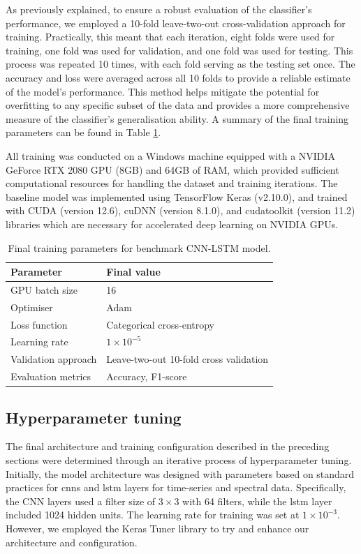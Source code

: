 As previously explained, to ensure a robust evaluation of the classifier's performance, we employed a 10-fold leave-two-out cross-validation approach for training. Practically, this meant that each iteration, eight folds were used for training, one fold was used for validation, and one fold was used for testing. This process was repeated 10 times, with each fold serving as the testing set once. The accuracy and loss were averaged across all 10 folds to provide a reliable estimate of the model's performance. This method helps mitigate the potential for overfitting to any specific subset of the data and provides a more comprehensive measure of the classifier's generalisation ability. A summary of the final training parameters can be found in Table \ref{tab:cnn-lstm-final-params}. 

All training was conducted on a Windows machine equipped with a NVIDIA GeForce RTX 2080 GPU (8GB) and 64GB of RAM, which provided sufficient computational resources for handling the dataset and training iterations. The baseline model was implemented using TensorFlow Keras (v2.10.0), and trained with CUDA (version 12.6), cuDNN (version 8.1.0), and cudatoolkit (version 11.2) libraries which are necessary for accelerated deep learning on NVIDIA GPUs. 

\begin{table}[htb]
    \centering
    \caption{Final training parameters for benchmark CNN-LSTM model.}
    \label{tab:cnn-lstm-final-params}
    \begin{tabular}{ll}
    \toprule
    \textbf{Parameter} & \textbf{Final value} \\ \midrule
    GPU batch size & 16 \\
    Optimiser & Adam \\
    Loss function & Categorical cross-entropy \\
    Learning rate & $1 \times 10^{-5}$ \\
    Validation approach & Leave-two-out 10-fold cross validation \\
    Evaluation metrics & Accuracy, F1-score \\ \bottomrule
    \end{tabular}
\end{table}

\subsection{Hyperparameter tuning}

The final architecture and training configuration described in the preceding sections were determined through an iterative process of hyperparameter tuning. Initially, the model architecture was designed with parameters based on standard practices for \acrshort{cnn}s and \acrshort{lstm} layers for time-series and spectral data. Specifically, the CNN layers used a filter size of $3 \times 3$ with 64 filters, while the \acrshort{lstm} layer included 1024 hidden units. The learning rate for training was set at $1 \times 10^{-3}$. However, we employed the Keras Tuner library to try and enhance our architecture and configuration. 

